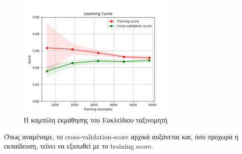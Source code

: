 \documentclass[11pt]{article} %
\begin{document}
\begin{figure}[H]
    \centering
    \includegraphics[width=0.7\textwidth]{plots/learning_curve.png}
    \caption{Η καμπύλη εκμάθησης του Ευκλείδιου ταξινομητή}
    \label{fig:learningcurve}
\end{figure}

Όπως αναμέναμε, το cross-validation-score αρχικά αυξάνεται και, όσο προχωρά η εκπαίδευση, τείνει να εξισωθεί με το training score.

 
\end{document}
